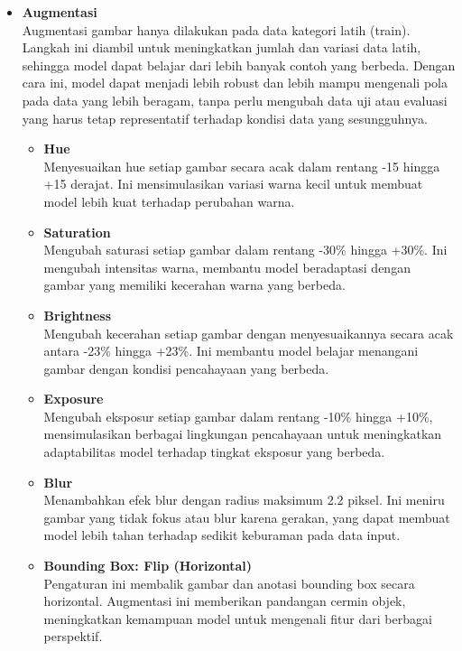 \documentclass[journal,article,submit,pdftex,moreauthors]{Definitions/mdpi}
\begin{document}
\begin{itemize}
     \item \textbf{Augmentasi}  \\
     Augmentasi gambar hanya dilakukan pada data kategori latih (train). Langkah ini diambil untuk meningkatkan jumlah dan variasi data latih, sehingga model dapat belajar dari lebih banyak contoh yang berbeda. Dengan cara ini, model dapat menjadi lebih robust dan lebih mampu mengenali pola pada data yang lebih beragam, tanpa perlu mengubah data uji atau evaluasi yang harus tetap representatif terhadap kondisi data yang sesungguhnya.

    \begin{itemize}
    \item \textbf{Hue} \\
    Menyesuaikan hue setiap gambar secara acak dalam rentang -15 hingga +15 derajat. Ini mensimulasikan variasi warna kecil untuk membuat model lebih kuat terhadap perubahan warna.

    \item \textbf{Saturation} \\
    Mengubah saturasi setiap gambar dalam rentang -30\% hingga +30\%. Ini mengubah intensitas warna, membantu model beradaptasi dengan gambar yang memiliki kecerahan warna yang berbeda.

    \item \textbf{Brightness} \\
    Mengubah kecerahan setiap gambar dengan menyesuaikannya secara acak antara -23\% hingga +23\%. Ini membantu model belajar menangani gambar dengan kondisi pencahayaan yang berbeda.

    \item \textbf{Exposure} \\
    Mengubah eksposur setiap gambar dalam rentang -10\% hingga +10\%, mensimulasikan berbagai lingkungan pencahayaan untuk meningkatkan adaptabilitas model terhadap tingkat eksposur yang berbeda.

    \item \textbf{Blur} \\
    Menambahkan efek blur dengan radius maksimum 2.2 piksel. Ini meniru gambar yang tidak fokus atau blur karena gerakan, yang dapat membuat model lebih tahan terhadap sedikit keburaman pada data input.

    \item \textbf{Bounding Box: Flip (Horizontal)} \\
    Pengaturan ini membalik gambar dan anotasi bounding box secara horizontal. Augmentasi ini memberikan pandangan cermin objek, meningkatkan kemampuan model untuk mengenali fitur dari berbagai perspektif.
    \end{itemize}

   
\end{itemize}
\end{document}
